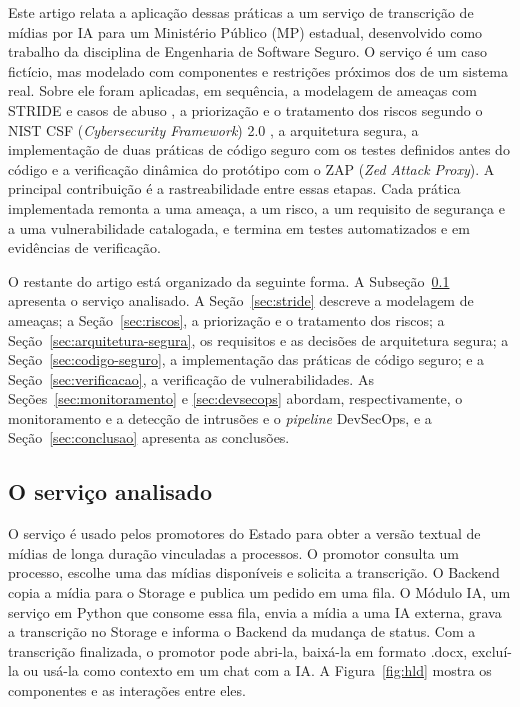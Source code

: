 \documentclass[12pt]{article}
\begin{document}
    Este artigo relata a aplicação dessas práticas a um serviço de transcrição de mídias por IA para um Ministério Público (MP) estadual, desenvolvido como trabalho da disciplina de Engenharia de Software Seguro. O serviço é um caso fictício, mas modelado com componentes e restrições próximos dos de um sistema real. Sobre ele foram aplicadas, em sequência, a modelagem de ameaças com STRIDE e casos de abuso \cite{kohnfelder:99,shostack:14}, a priorização e o tratamento dos riscos segundo o NIST CSF (\textit{Cybersecurity Framework}) 2.0 \cite{nist:csf2}, a arquitetura segura, a implementação de duas práticas de código seguro com os testes definidos antes do código e a verificação dinâmica do protótipo com o ZAP (\textit{Zed Attack Proxy}). A principal contribuição é a rastreabilidade entre essas etapas. Cada prática implementada remonta a uma ameaça, a um risco, a um requisito de segurança e a uma vulnerabilidade catalogada, e termina em testes automatizados e em evidências de verificação.

    O restante do artigo está organizado da seguinte forma. A Subseção~\ref{sec:servico} apresenta o serviço analisado. A Seção~\ref{sec:stride} descreve a modelagem de ameaças; a Seção~\ref{sec:riscos}, a priorização e o tratamento dos riscos; a Seção~\ref{sec:arquitetura-segura}, os requisitos e as decisões de arquitetura segura; a Seção~\ref{sec:codigo-seguro}, a implementação das práticas de código seguro; e a Seção~\ref{sec:verificacao}, a verificação de vulnerabilidades. As Seções~\ref{sec:monitoramento} e \ref{sec:devsecops} abordam, respectivamente, o monitoramento e a detecção de intrusões e o \textit{pipeline} DevSecOps, e a Seção~\ref{sec:conclusao} apresenta as conclusões.

    \subsection{O serviço analisado}
    \label{sec:servico}

    O serviço é usado pelos promotores do Estado para obter a versão textual de mídias de longa duração vinculadas a processos. O promotor consulta um processo, escolhe uma das mídias disponíveis e solicita a transcrição. O Backend copia a mídia para o Storage e publica um pedido em uma fila.
    O Módulo IA, um serviço em Python que consome essa fila, envia a mídia a uma IA externa, grava a transcrição no Storage e informa o Backend da mudança de status. Com a transcrição finalizada, o promotor pode abri-la, baixá-la em formato .docx, excluí-la ou usá-la como contexto em um chat com a IA. A Figura~\ref{fig:hld} mostra os componentes e as interações entre eles.
\end{document}
